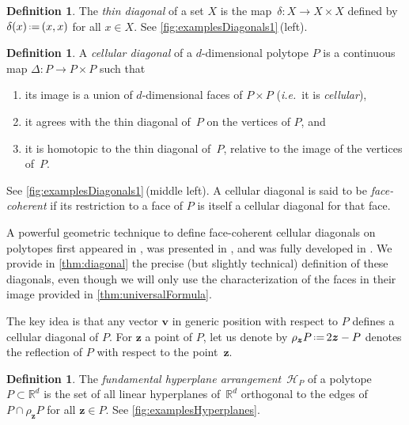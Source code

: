 \documentclass{amsart}
\newcommand{\darkblue}{\color{darkblue}} %
\theoremstyle{definition}
\newtheorem{definition}[theorem]{Definition}
\newcommand{\R}{\mathbb{R}} %
\renewcommand{\b}[1]{{\boldsymbol{#1}}} %
\newcommand{\eqdef}{\mbox{\,\raisebox{0.2ex}{\scriptsize\ensuremath{\mathrm:}}\ensuremath{=}\,}} %
\newcommand{\ie}{\textit{i.e.}~} %
\newcommand{\defn}[1]{\textsl{\darkblue #1}} %
\renewcommand{\b}[1]{\boldsymbol{#1}} %
\begin{document}
\begin{definition} 
\label{def:thinDiagonal}
The \defn{thin diagonal} of a set $X$ is the map~$\delta : X \to X \times X$ defined by $\delta(x) \eqdef (x,x)$ for all $x \in X$.
See \cref{fig:examplesDiagonals1}\,(left).
\end{definition}

\begin{definition} 
\label{def:cellularDiagonal}
A \defn{cellular diagonal} of a $d$-dimensional polytope $P$ is a continuous map ${\Delta : P \to P \times P}$ such that
\begin{enumerate}
\item its image is a union of $d$-dimensional faces of $P\times P$ (\ie it is \defn{cellular}),
\item it agrees with the thin diagonal of~$P$ on the vertices of $P$, and
\item it is homotopic to the thin diagonal of~$P$, relative to the image of the vertices of~$P$. 
\end{enumerate}
See \cref{fig:examplesDiagonals1}\,(middle left).
A cellular diagonal is said to be \defn{face-coherent} if its restriction to a face of $P$ is itself a cellular diagonal for that face. 
\end{definition}

A powerful geometric technique to define face-coherent cellular diagonals on polytopes first appeared in \cite{fultonIntersectionTheoryToric1997a}, was presented in \cite{masudaDiagonalAssociahedra2021}, and was fully developed in \cite{LA21}.
We provide in \cref{thm:diagonal} the precise (but slightly technical) definition of these diagonals, even though we will only use the characterization of the faces in their image provided in \cref{thm:universalFormula}.

The key idea is that any vector $\b{v}$ in generic position with respect to $P$ defines a cellular diagonal of $P$.
For $\b{z}$ a point of $P$, let us denote by $\rho_{\b{z}} P \eqdef 2\b{z}-P$ denotes the reflection of $P$ with respect to the point~$\b{z}$.

\begin{definition}
    The \defn{fundamental hyperplane arrangement}~$\mathcal{H}_P$ of a polytope~$P \subset \R^d$ is the set of all linear hyperplanes of~$\R^d$ orthogonal to the edges of $P\cap \rho_{\b{z}} P$ for all $\b{z} \in P$. 
    See \cref{fig:examplesHyperplanes}.
\end{definition}
\end{document}
